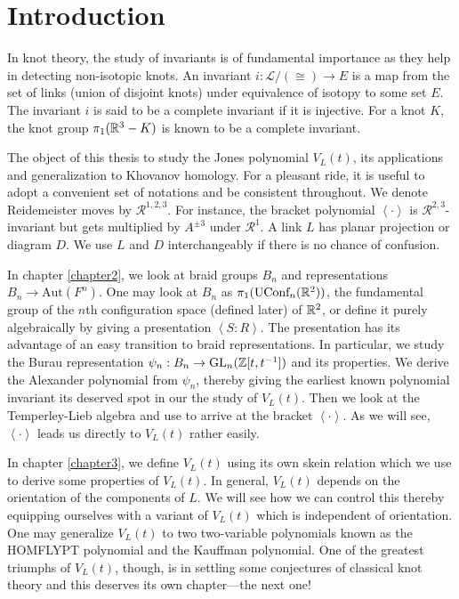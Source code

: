 \chapter{Introduction}
\label{chapter1}

In knot theory, the study of invariants is of fundamental importance as they help in detecting non-isotopic knots. An invariant $i : \mathcal{L}/(\cong) \to E $ is a map from the set of links (union of disjoint knots) under equivalence of isotopy to some set $E$. The invariant $i$ is said to be a complete invariant if it is injective. For a knot $K$, the knot group $\pi_1(\mathbb{R}^3-K)$ is known to be a complete invariant.

The object of this thesis to study the Jones polynomial $V_L(t)$, its applications and generalization to Khovanov homology. For a pleasant ride, it is useful to adopt a convenient set of notations and be consistent throughout. We denote Reidemeister moves by $\mathcal{R}^{1,2,3}$. For instance, the bracket polynomial $\left< \cdot \right>$ is $\mathcal{R}^{2,3}$-invariant but gets multiplied by $A^{\pm 3}$ under $\mathcal{R}^1$. A link $L$ has planar projection or diagram $D$. We use $L$ and $D$ interchangeably if there is no chance of confusion. %

In chapter \ref{chapter2}, we look at braid groups $B_n$ and representations $B_n \to \text{Aut}(F^n)$. One may look at $B_n$ as $\pi_1(\text{UConf}_n(\mathbb{R}^2))$, the fundamental group of the $n$th configuration space (defined later) of $\mathbb{R}^2$, or define it purely algebraically by giving a presentation $\left< S : R \right>$. The presentation has its advantage of an easy transition to braid representations. In particular, we study the Burau representation $\psi_n : B_n \to \text{GL}_n(\mathbb{Z}[t, t^{-1}])$ and its properties. We derive the Alexander polynomial from $\psi_n$, thereby giving the earliest known polynomial invariant its deserved spot in our the study of $V_L(t)$. Then we look at the Temperley-Lieb algebra and use to arrive at the bracket $\left< \cdot \right>$. As we will see, $\left< \cdot \right>$ leads us directly to $V_L(t)$ rather easily.

In chapter \ref{chapter3}, we define $V_L(t)$ using its own skein relation which we use to derive some properties of $V_L(t)$. In general, $V_L(t)$ depends on the orientation of the components of $L$. We will see how we can control this thereby equipping ourselves with a variant of $V_L(t)$ which is independent of orientation. One may generalize $V_L(t)$ to two two-variable polynomials known as the HOMFLYPT polynomial and the Kauffman polynomial. One of the greatest triumphs of $V_L(t)$, though, is in settling some conjectures of classical knot theory and this deserves its own chapter---the next one!

